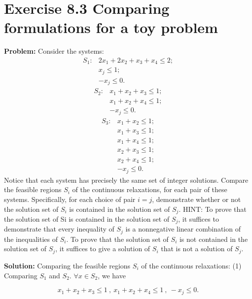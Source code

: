 \section{Exercise 8.3 Comparing formulations for a toy problem}
\textbf{Problem:} Consider the systems:
\begin{equation}
\label{eq: s1}
  \begin{array}{lrcll}
    S_{1}: & 2x_1+2x_2+x_3+x_4\leq 2;\\
    & x_j\leq 1;\\
    & -x_j\leq 0.
  \end{array}
\end{equation}
\begin{equation}
\label{eq: s2}
  \begin{array}{lrcll}
    S_{2}: & x_1+x_2+x_3\leq 1;\\
    & x_1+x_2+x_4\leq 1;\\
    & -x_j\leq 0.
  \end{array}
\end{equation}
\begin{equation}
\label{eq: s3}
  \begin{array}{lrcll}
    S_{3}: & x_1+x_2\leq 1;\\
    & x_1+x_3\leq 1;\\
    & x_1+x_4\leq 1;\\
    & x_2+x_3\leq 1;\\
    & x_2+x_4\leq 1;\\
    & -x_j\leq 0.
  \end{array}
\end{equation}
Notice that each system has precisely the same set of integer solutions. Compare the feasible regions $S_i$ of the continuous relaxations, for each pair of these systems. Specifically, for each choice of pair $i=j$, demonstrate whether or not the solution set of $S_i$ is contained in the solution set of $S_j$. HINT: To prove that the solution set of Si is contained in the solution set of $S_j$, it suffices to demonstrate that every inequality of $S_j$ is a nonnegative linear combination of the inequalities of $S_i$. To prove that the solution set of $S_i$ is not contained in the solution set of $S_j$, it suffices to give a solution of $S_i$ that is not a solution of $S_j$.


\textbf{Solution:} Comparing the feasible regions $S_i$ of the continuous relaxations: (1) Comparing $S_1$ and $S_2$. $\forall x \in S_2$, we have

$$ x_1+x_2+x_3\leq 1~,~x_1+x_2+x_4\leq 1~,~-x_j\leq 0. $$

